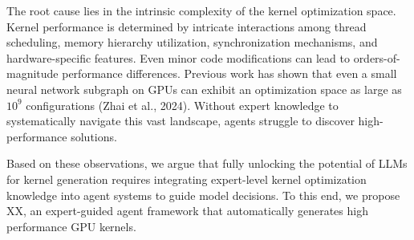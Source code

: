The root cause lies in the intrinsic complexity of the kernel optimization space. Kernel performance is determined by intricate interactions among thread scheduling, memory hierarchy utilization, synchronization mechanisms, and hardware-specific features. Even minor code modifications can lead to orders-of-magnitude performance differences. Previous work has shown that even a small neural network subgraph on GPUs can exhibit an optimization space as large as $10^9$ configurations (Zhai et al., 2024). Without expert knowledge to systematically navigate this vast landscape, agents struggle to discover high-performance solutions.



Based on these observations, we argue that fully unlocking the potential of LLMs for kernel generation requires integrating expert-level kernel optimization knowledge into agent systems to guide model decisions. To this end, we propose XX, an expert-guided agent framework that automatically generates high performance GPU kernels.

